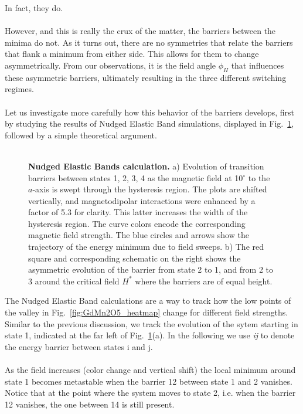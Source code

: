 In fact, they do.
\\\\
However, and this is really the crux of the matter, the barriers between the minima do not. As it turns out, there are no symmetries that relate the barriers that flank a minimum from either side.
This allows for them to change asymmetrically.
From our observations, it is the field angle $\phi_H$ that influences these asymmetric barriers, ultimately resulting in the three different switching regimes.
\\\\
Let us investigate more carefully how this behavior of the barriers develops, first by studying the results of Nudged Elastic Band simulations, displayed in Fig.~\ref{fig:GdMn2O5_neb}, followed by a simple theoretical argument.
\\\\
\begin{figure}[h]
    \caption{\label{fig:GdMn2O5_neb}{\bf Nudged Elastic Bands calculation.}
    a) Evolution of transition barriers between states 1, 2, 3, 4 as the magnetic field at 10$^\circ$ to the $a$-axis is swept through the hysteresis region. The plots are shifted vertically, and magnetodipolar interactions were enhanced by a factor of 5.3 for clarity. This latter increases the width of the hysteresis region. The curve colors encode the corresponding magnetic field strength. The blue circles and arrows show the trajectory of the energy minimum due to field sweeps.
    b) The red square and corresponding schematic on the right shows the asymmetric evolution of the barrier from state 2 to 1, and from 2 to 3 around the critical field $H^\ast$ where the barriers are of equal height.
    }
\end{figure}
%
The Nudged Elastic Band calculations are a way to track how the low points of the valley in Fig.~\ref{fig:GdMn2O5_heatmap} change for different field strengths.
Similar to the previous discussion, we track the evolution of the sytem starting in state 1, indicated at the far left of Fig.~\ref{fig:GdMn2O5_neb}(a).
In the following we use {\it ij} to denote the energy barrier between states i and j.
\\\\
As the field increases (color change and vertical shift) the local minimum around state 1 becomes metastable when the barrier 12 between state 1 and 2 vanishes.
Notice that at the point where the system moves to state 2, i.e. when the barrier 12 vanishes, the one between 14 is still present.
